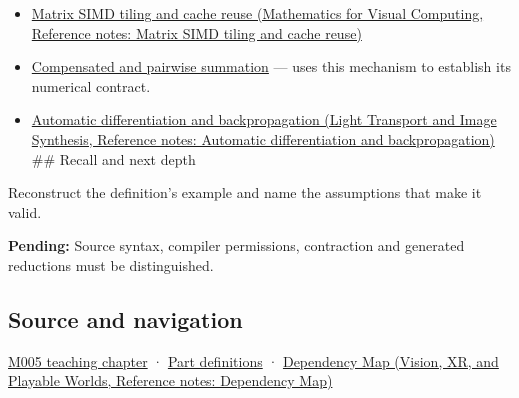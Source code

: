 \hypertarget{appendix-c2ac4a84c283-used-by}{}

\begin{itemize}
\item
  \href{../02-Mathematics-for-Visual-Computing/main.pdf\#nameddest=appendix-1bfb7c657105}{Matrix SIMD tiling and cache reuse (Mathematics for Visual Computing, Reference notes: Matrix SIMD tiling and cache reuse)}
\item
  \hyperref[appendix-df318da57389]{Compensated and pairwise summation} --- uses this mechanism to establish its numerical contract.
\item
  \href{../04-Light-Transport-and-Image-Synthesis/main.pdf\#nameddest=appendix-40df0855b4a7}{Automatic differentiation and backpropagation (Light Transport and Image Synthesis, Reference notes: Automatic differentiation and backpropagation)} \#\# Recall and next depth
\end{itemize}

Reconstruct the definition's example and name the assumptions that make it valid.

\textbf{Pending:} Source syntax, compiler permissions, contraction and generated reductions must be distinguished.

\subsection{Source and navigation}\label{appendix-c2ac4a84c283-source-and-navigation}

\hypertarget{appendix-c2ac4a84c283-source-and-navigation}{}

\hyperref[01-foundations-i-ch001-when-arithmetic-meets-uncertainty]{M005 teaching chapter} · \hyperref[appendix-fd090d982a15-m005---parts-77-88]{Part definitions} · \href{../07-Vision-XR-and-Playable-Worlds/main.pdf\#nameddest=appendix-4ad47bdd269a}{Dependency Map (Vision, XR, and Playable Worlds, Reference notes: Dependency Map)}
